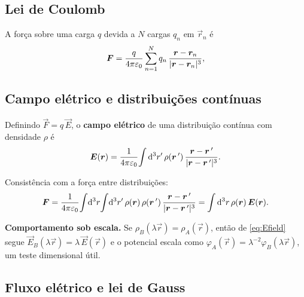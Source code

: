 \subsection{Lei de Coulomb}

A força sobre uma carga $q$ devida a $N$ cargas $q_n$ em $\vec{r}_n$ é
\begin{equation}
  \bm{F}=\frac{q}{4\pi\varepsilon_{0}}\sum_{n=1}^{N} q_n\,
          \frac{\bm{r}-\bm{r}_n}{|\bm{r}-\bm{r}_n|^{3}},
\end{equation}

\subsection{Campo elétrico e distribuições contínuas}

Definindo $\vec{F}=q\,\vec{E}$, o \textbf{campo elétrico} de uma distribuição
contínua com densidade $\rho$ é
\begin{equation}
  \bm{E}(\bm{r})=\frac{1}{4\pi\varepsilon_{0}}\!\int \mathrm{d}^3r'\,\rho(\bm{r}\,')\,
     \frac{\bm{r}-\bm{r}\,'}{|\bm{r}-\bm{r}\,'|^{3}}.
  \label{eq:Efield}
\end{equation}
\begin{nota}
Consistência com a força entre distribuições:
\begin{equation}
  \bm{F}=\frac{1}{4\pi\varepsilon_{0}}\!\int\!\mathrm{d}^3r\!\int\!\mathrm{d}^3r'\,
    \rho(\bm{r})\,\rho(\bm{r}\,')\,
    \frac{\bm{r}-\bm{r}\,'}{|\bm{r}-\bm{r}\,'|^{3}}
  =\int \mathrm{d}^3r\,\rho(\bm{r})\,\bm{E}(\bm{r}).
\end{equation}
\end{nota}

\begin{obs}
\textbf{Comportamento sob escala.} Se $\rho_B(\lambda\vec{r})=\rho_A(\vec{r})$,
então de \eqref{eq:Efield} segue $\vec{E}_B(\lambda\vec{r})=\lambda\,\vec{E}(\vec{r})$
e o potencial escala como $\varphi_A(\vec{r})=\lambda^{-2}\varphi_B(\lambda\vec{r})$,
um teste dimensional útil.
\end{obs}

\subsection{Fluxo elétrico e lei de Gauss}

